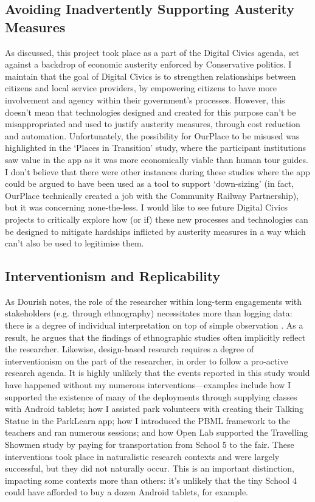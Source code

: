 \subsection*{Avoiding Inadvertently Supporting Austerity Measures} 
\label{sec:InadvertentlySupportingAusterity}

As discussed, this project took place as a part of the Digital Civics agenda, set against a backdrop of economic austerity enforced by Conservative politics. I maintain that the goal of Digital Civics is to strengthen relationships between citizens and local service providers, by empowering citizens to have more involvement and agency within their government’s processes. However, this doesn't mean that technologies designed and created for this purpose can't be misappropriated and used to justify austerity measures, through cost reduction and automation. Unfortunately, the possibility for OurPlace to be misused was highlighted in the `Places in Transition' study, where the participant institutions saw value in the app as it was more economically viable than human tour guides. I don't believe that there were other instances during these studies where the app could be argued to have been used as a tool to support `down-sizing' (in fact, OurPlace technically created a job with the Community Railway Partnership), but it was concerning none-the-less. I would like to see future Digital Civics projects to critically explore how (or if) these new processes and technologies can be designed to mitigate hardships inflicted by austerity measures in a way which can't also be used to legitimise them.

\subsection*{Interventionism and Replicability}

As Dourish notes, the role of the researcher within long-term engagements with stakeholders (e.g. through ethnography) necessitates more than logging data: there is a degree of individual interpretation on top of simple observation \citep{Dourish2006}. As a result, he argues that the findings of ethnographic studies often implicitly reflect the researcher.  Likewise, design-based research requires a degree of interventionism on the part of the researcher, in order to follow a pro-active research agenda. It is highly unlikely that the events reported in this study would have happened without my numerous interventions---examples include how I supported the existence of many of the deployments through supplying classes with Android tablets; how I assisted park volunteers with creating their Talking Statue in the ParkLearn app; how I introduced the PBML framework to the teachers and ran numerous sessions; and how Open Lab supported the Travelling Showmen study by paying for transportation from School 5 to the fair. These interventions took place in naturalistic research contexts and were largely successful, but they did not naturally occur. This is an important distinction, impacting some contexts more than others: it's unlikely that the tiny School 4 could have afforded to buy a dozen Android tablets, for example.

